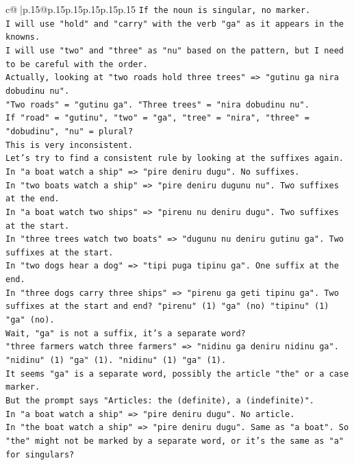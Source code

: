 \documentclass{article}
\begin{document}
{\begin{supertabular}{c@{$\;$}|p{.15\linewidth}@{}p{.15\linewidth}p{.15\linewidth}p{.15\linewidth}p{.15\linewidth}p{.15\linewidth}}
{{{\texttt{If the noun is singular, no marker.} \\
\texttt{I will use "hold" and "carry" with the verb "ga" as it appears in the knowns.} \\
\texttt{I will use "two" and "three" as "nu" based on the pattern, but I need to be careful with the order.} \\
\texttt{Actually, looking at "two roads hold three trees" => "gutinu ga nira dobudinu nu".} \\
\texttt{"Two roads" = "gutinu ga". "Three trees" = "nira dobudinu nu".} \\
\texttt{If "road" = "gutinu", "two" = "ga", "tree" = "nira", "three" = "dobudinu", "nu" = plural?} \\
\texttt{This is very inconsistent.} \\
\texttt{Let's try to find a consistent rule by looking at the suffixes again.} \\
\texttt{In "a boat watch a ship" => "pire deniru dugu". No suffixes.} \\
\texttt{In "two boats watch a ship" => "pire deniru dugunu nu". Two suffixes at the end.} \\
\texttt{In "a boat watch two ships" => "pirenu nu deniru dugu". Two suffixes at the start.} \\
\texttt{In "three trees watch two boats" => "dugunu nu deniru gutinu ga". Two suffixes at the start.} \\
\texttt{In "two dogs hear a dog" => "tipi puga tipinu ga". One suffix at the end.} \\
\texttt{In "three dogs carry three ships" => "pirenu ga geti tipinu ga". Two suffixes at the start and end? "pirenu" (1) "ga" (no) "tipinu" (1) "ga" (no).} \\
\texttt{Wait, "ga" is not a suffix, it's a separate word?} \\
\texttt{"three farmers watch three farmers" => "nidinu ga deniru nidinu ga".} \\
\texttt{"nidinu" (1) "ga" (1). "nidinu" (1) "ga" (1).} \\
\texttt{It seems "ga" is a separate word, possibly the article "the" or a case marker.} \\
\texttt{But the prompt says "Articles: the (definite), a (indefinite)".} \\
\texttt{In "a boat watch a ship" => "pire deniru dugu". No article.} \\
\texttt{In "the boat watch a ship" => "pire deniru dugu". Same as "a boat". So "the" might not be marked by a separate word, or it's the same as "a" for singulars?} \\
}}}
\end{supertabular}}
\end{document}
